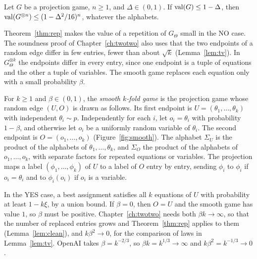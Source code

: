 \begin{theorem}\label{thm:rep}
Let $G$ be a projection game, $n\ge1$, and $\Delta\in(0,1)$. If $\operatorname{val}(G)\le1-\Delta$, then $\operatorname{val}(G^{\otimes n})\le(1-\Delta^2/16)^n$, whatever the alphabets.
\end{theorem}

Theorem~\ref{thm:rep} makes the value of a repetition of $G_\Theta$ small in the NO case. The soundness proof of Chapter~\ref{ch:twotwo} also uses that the two endpoints of a random edge differ in few entries, fewer than about $\sqrt k$ (Lemma~\ref{lem:tv}). In $G_\Theta^{\otimes k}$ the endpoints differ in every entry, since one endpoint is a tuple of equations and the other a tuple of variables. The smooth game replaces each equation only with a small probability $\beta$.

\begin{definition}\label{def:smooth}
For $k\ge1$ and $\beta\in(0,1)$, the \emph{smooth $k$-fold game} is the projection game whose random edge $(U,O)$ is drawn as follows. Its first endpoint is $U=(\theta_1,\dots,\theta_k)$ with independent $\theta_i\sim p$. Independently for each $i$, let $o_i=\theta_i$ with probability $1-\beta$, and otherwise let $o_i$ be a uniformly random variable of $\theta_i$. The second endpoint is $O=(o_1,\dots,o_k)$ (Figure~\ref{fig:smooth}). The alphabet $\Sigma_U$ is the product of the alphabets of $\theta_1,\dots,\theta_k$, and $\Sigma_O$ the product of the alphabets of $o_1,\dots,o_k$, with separate factors for repeated equations or variables. The projection maps a label $(\phi_1,\dots,\phi_k)$ of $U$ to a label of $O$ entry by entry, sending $\phi_i$ to $\phi_i$ if $o_i=\theta_i$ and to $\phi_i(o_i)$ if $o_i$ is a variable.
\end{definition}

In the YES case, a best assignment satisfies all $k$ equations of $U$ with probability at least $1-k\xi$, by a union bound. If $\beta=0$, then $O=U$ and the smooth game has value $1$, so $\beta$ must be positive. Chapter~\ref{ch:twotwo} needs both $\beta k\to\infty$, so that the number of replaced entries grows and Theorem~\ref{thm:rep} applies to them (Lemma~\ref{lem:clean}), and $k\beta^2\to0$, for the comparison of laws in Lemma~\ref{lem:tv}. OpenAI takes $\beta=k^{-2/3}$, so $\beta k=k^{1/3}\to\infty$ and $k\beta^2=k^{-1/3}\to0$.

